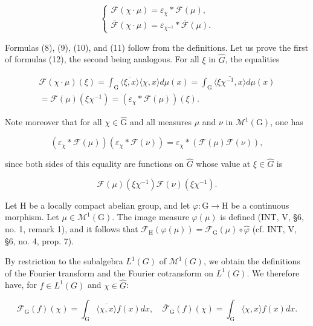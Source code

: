 \[
\left\{ \begin{array}{l} \mathcal {F} (\chi \cdot \mu) = \varepsilon_ {\chi} * \mathcal {F} (\mu), \\ \overline {{\mathcal {F}}} (\chi \cdot \mu) = \varepsilon_ {\chi^ {- 1}} * \overline {{\mathcal {F}}} (\mu). \end{array} \right.
\]

Formulas (8), (9), (10), and (11) follow from the definitions. Let us prove the first of formulas (12), the second being analogous. For all \(\xi\) in \(\widehat{G}\), the equalities

\[
\begin{array}{c} \mathcal {F} (\chi \cdot \mu) (\xi) = \int_ {\mathrm{G}} \overline {{\langle \xi , x \rangle}} \langle \chi , x \rangle d \mu (x) = \int_ {\mathrm{G}} \overline {{\langle \xi \chi^ {- 1} , x \rangle}} d \mu (x) \\ = \mathcal {F} (\mu) (\xi \chi^ {- 1}) = (\varepsilon_ {\chi} * \mathcal {F} (\mu)) (\xi). \end{array}
\]

Note moreover that for all \(\chi\in\widehat{\mathrm{G}}\) and all measures \(\mu\) and \(\nu\) in \(\mathcal{M}^{1}(\mathrm{G})\), one has

\[
(\varepsilon_ {\chi} * \mathcal {F} (\mu)) (\varepsilon_ {\chi} * \mathcal {F} (\nu)) = \varepsilon_ {\chi} * (\mathcal {F} (\mu) \mathcal {F} (\nu)),\tag{13}
\]

since both sides of this equality are functions on \(\widehat{G}\) whose value at \(\xi\in\widehat{G}\) is

\[
\mathcal {F} (\mu) (\xi \chi^ {- 1}) \mathcal {F} (\nu) (\xi \chi^ {- 1}).
\]

Let H be a locally compact abelian group, and let \(\varphi\colon\mathrm{G}\to\mathrm{H}\) be a continuous morphism. Let \(\mu\in\mathcal{M}^{1}(\mathrm{G})\). The image measure \(\varphi(\mu)\) is defined (INT, V, §6, no. 1, remark 1), and it follows that \(\mathcal{F}_{\mathrm{H}}(\varphi(\mu))=\mathcal{F}_{\mathrm{G}}(\mu)\circ\widehat{\varphi}\) (cf. INT, V, §6, no. 4, prop. 7).

By restriction to the subalgebra \(L^{1}(G)\) of \(\mathcal{M}^{1}(G)\), we obtain the definitions of the Fourier transform and the Fourier cotransform on \(L^{1}(G)\). We therefore have, for \(f \in L^{1}(G)\) and \(\chi \in \widehat{G}\):

\[
\mathcal {F} _ {\mathrm{G}} (f) (\chi) = \int_ {\mathrm{G}} \overline {{\langle \chi , x \rangle}} f (x) d x, \quad \overline {{\mathcal {F}}} _ {\mathrm{G}} (f) (\chi) = \int_ {\mathrm{G}} \langle \chi , x \rangle f (x) d x.\tag{14}
\]

